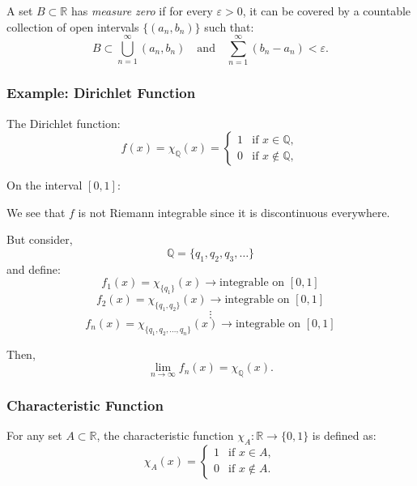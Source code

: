 \documentclass[11pt]{article}
\begin{document}
A set $B \subset \mathbb{R}$ has \textit{measure zero} if for every $\varepsilon > 0$, it can be covered by a countable collection of open intervals $\{(a_n, b_n)\}$ such that:
\[B \subset \bigcup_{n=1}^{\infty} (a_n, b_n) \quad \text{and} \quad \sum_{n=1}^{\infty} (b_n - a_n) < \varepsilon.\]

\subsubsection{Example: Dirichlet Function}
The Dirichlet function:
\[ f(x) = \chi_{\mathbb{Q}}(x) = \begin{cases} 1 & \text{if } x \in \mathbb{Q}, \\ 0 & \text{if } x \notin \mathbb{Q}, \end{cases} \]

On the interval \([0, 1]\): 
\begin{center}
\end{center}

We see that \(f\) is not Riemann integrable since it is discontinuous everywhere. 

But consider, 
\[\mathbb{Q} = \{q_1, q_2, q_3, \ldots\}\] 
and define:
\[f_1(x) = \chi_{\{q_1\}}(x) \rightarrow \text{integrable on } [0, 1]\]
\[f_2(x) = \chi_{\{q_1, q_2\}}(x) \rightarrow \text{integrable on } [0, 1]\]
\[\vdots\]
\[f_n(x) = \chi_{\{q_1, q_2, \ldots, q_n\}}(x) \rightarrow \text{integrable on } [0, 1]\]

Then,
\[\lim_{n \to \infty} f_n(x) = \chi_{\mathbb{Q}}(x).\]

\subsubsection{Characteristic Function}
For any set \(A \subset \mathbb{R}\), the characteristic function \(\chi_A: \mathbb{R} \to \{0, 1\}\) is defined as:
\[\chi_A(x) = \begin{cases} 1 & \text{if } x \in A, \\ 0 & \text{if } x \notin A. \end{cases}\]
\end{document}
